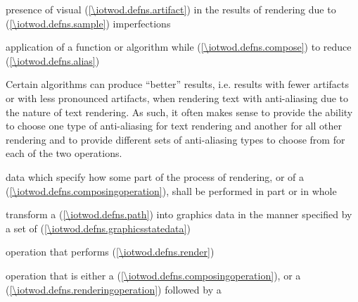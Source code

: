 %
presence of visual  (\ref{\iotwod.defns.artifact}) in the results of rendering due to  (\ref{\iotwod.defns.sample}) imperfections

%
application of a function or algorithm while  (\ref{\iotwod.defns.compose}) to reduce  (\ref{\iotwod.defns.alias})
\begin{note}
Certain algorithms can produce ``better'' results, i.e. results with fewer artifacts or with less pronounced artifacts, when rendering text with anti-aliasing due to the nature of text rendering. As such, it often makes sense to provide the ability to choose one type of anti-aliasing for text rendering and another for all other rendering and to provide different sets of anti-aliasing types to choose from for each of the two operations.
\end{note}

%
data which specify how some part of the process of rendering, or of a  (\ref{\iotwod.defns.composingoperation}), shall be performed in part or in whole

%
transform a  (\ref{\iotwod.defns.path}) into graphics data in the manner specified by a set of  (\ref{\iotwod.defns.graphicsstatedata})

%
operation that performs  (\ref{\iotwod.defns.render})

%
operation that is either a  (\ref{\iotwod.defns.composingoperation}), or a  (\ref{\iotwod.defns.renderingoperation}) followed by a 

%

%
%

